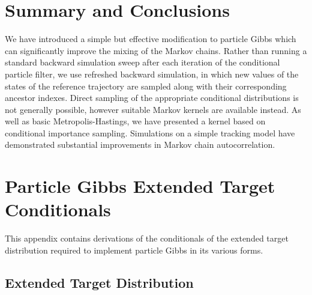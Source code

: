 \documentclass[10pt]{article}
\begin{document}
\section{Summary and Conclusions}

We have introduced a simple but effective modification to particle Gibbs which can significantly improve the mixing of the Markov chains. Rather than running a standard backward simulation sweep after each iteration of the conditional particle filter, we use refreshed backward simulation, in which new values of the states of the reference trajectory are sampled along with their corresponding ancestor indexes. Direct sampling of the appropriate conditional distributions is not generally possible, however suitable Markov kernels are available instead. As well as basic Metropolis-Hastings, we have presented a kernel based on conditional importance sampling. Simulations on a simple tracking model have demonstrated substantial improvements in Markov chain autocorrelation. 


\clearpage

\appendix

\section{Particle Gibbs Extended Target Conditionals} \label{app:pg-ed-derivations}

This appendix contains derivations of the conditionals of the extended target distribution required to implement particle Gibbs in its various forms.

\subsection{Extended Target Distribution}
\end{document}
